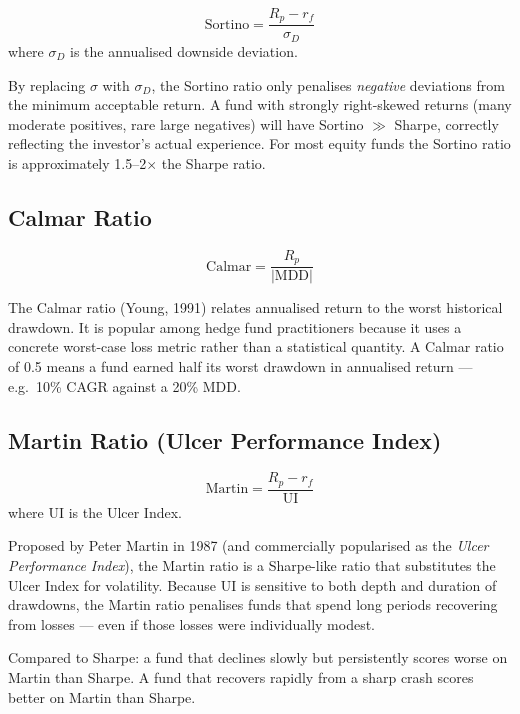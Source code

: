 \documentclass[12pt, a4paper]{article}
\newcommand{\rf}{r_f}
\begin{document}
\begin{definition}
\[
  \text{Sortino} = \frac{R_p - \rf}{\sigma_D}
\]
where $\sigma_D$ is the annualised downside deviation.
\end{definition}

\begin{interpretation}
By replacing $\sigma$ with $\sigma_D$, the Sortino ratio only penalises
\emph{negative} deviations from the minimum acceptable return.  A fund
with strongly right-skewed returns (many moderate positives, rare large
negatives) will have Sortino $\gg$ Sharpe, correctly reflecting the
investor's actual experience.  For most equity funds the Sortino ratio is
approximately 1.5--2$\times$ the Sharpe ratio.
\end{interpretation}

\subsection{Calmar Ratio}

\begin{definition}
\[
  \text{Calmar} = \frac{R_p}{|\mathrm{MDD}|}
\]
\end{definition}

The Calmar ratio (Young, 1991) relates annualised return to the worst
historical drawdown.  It is popular among hedge fund practitioners because
it uses a concrete worst-case loss metric rather than a statistical
quantity.  A Calmar ratio of 0.5 means a fund earned half its worst
drawdown in annualised return — e.g.\ 10\% CAGR against a 20\% MDD.

\subsection{Martin Ratio (Ulcer Performance Index)}

\begin{definition}
\[
  \text{Martin} = \frac{R_p - \rf}{\mathrm{UI}}
\]
where $\mathrm{UI}$ is the Ulcer Index.
\end{definition}

\begin{interpretation}
Proposed by Peter Martin in 1987 (and commercially popularised as the
\emph{Ulcer Performance Index}), the Martin ratio is a Sharpe-like ratio
that substitutes the Ulcer Index for volatility.  Because UI is sensitive
to both depth and duration of drawdowns, the Martin ratio penalises funds
that spend long periods recovering from losses — even if those losses were
individually modest.

Compared to Sharpe: a fund that declines slowly but persistently scores
worse on Martin than Sharpe.  A fund that recovers rapidly from a sharp
crash scores better on Martin than Sharpe.
\end{interpretation}
\end{document}
